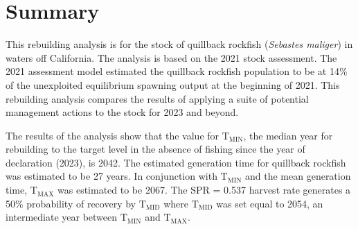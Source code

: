 \documentclass[11pt,
  english,
  a4paper,
]{article}
\begin{document}
\newcommand{\lt}{\ensuremath <}
\newcommand{\gt}{\ensuremath >}


\pagebreak
{}
\setcounter{page}{1}

\renewcommand{\thetable}{\roman{table}}
\renewcommand{\thefigure}{\roman{figure}}

\setlength\parskip{0.5em plus 0.1em minus 0.2em}


\hypertarget{summary}{%
\section*{Summary}\label{summary}}

\leavevmode\tagmcend\tagstructend


This rebuilding analysis is for the stock of quillback rockfish (\emph{Sebastes maliger}) in waters off California. The analysis is based on the 2021 stock assessment. The 2021 assessment model estimated the quillback rockfish population to be at 14\% of the unexploited equilibrium spawning output at the beginning of 2021. This rebuilding analysis compares the results of applying a suite of potential management actions to the stock for 2023 and beyond.

\leavevmode\tagmcend\tagstructend\par


The results of the analysis show that the value for {\(\text{T}_\text{MIN}\)\leavevmode\tagmcend\tagstructend}, the median year for rebuilding to the target level in the absence of fishing since the year of declaration (2023), is 2042. The estimated generation time for quillback rockfish was estimated to be 27 years. In conjunction with {\(\text{T}_\text{MIN}\)\leavevmode\tagmcend\tagstructend} and the mean generation time, {\(\text{T}_\text{MAX}\)\leavevmode\tagmcend\tagstructend} was estimated to be 2067. The SPR = 0.537 harvest rate generates a 50\% probability of recovery by {\(\text{T}_\text{MID}\)\leavevmode\tagmcend\tagstructend} where {\(\text{T}_\text{MID}\)\leavevmode\tagmcend\tagstructend} was set equal to 2054, an intermediate year between {\(\text{T}_\text{MIN}\)\leavevmode\tagmcend\tagstructend} and {\(\text{T}_\text{MAX}\)\leavevmode\tagmcend\tagstructend}.
\end{document}
